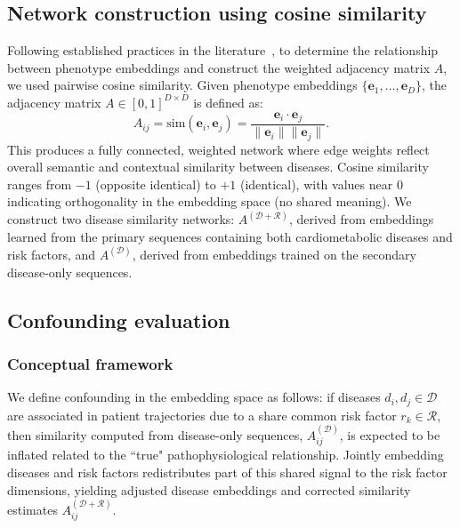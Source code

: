 \subsection{Network construction using cosine similarity}\label{subsection:network_con}
Following established practices in the literature~\citet{gundougan2020research}, to determine the relationship between phenotype embeddings and construct the weighted adjacency matrix $A$, we used pairwise cosine similarity. Given phenotype embeddings $\{\mathbf{e}_1, \ldots, \mathbf{e}_D\}$, the adjacency matrix $A \in [0,1]^{D \times D}$ is defined as:
\begin{equation}\label{eq:cosine_similarity}
A_{ij} = \text{sim}(\mathbf{e}_i, \mathbf{e}_j) = \frac{\mathbf{e}_i \cdot \mathbf{e}_j}{\|\mathbf{e}_i\| \|\mathbf{e}_j\|}.
\end{equation}
This produces a fully connected, weighted network where edge weights reflect overall semantic and contextual similarity between diseases. Cosine similarity ranges from $-1$ (opposite identical) to $+1$ (identical), with values near 0 indicating orthogonality in the embedding space (no shared meaning). We construct two disease similarity networks: $A^{(\mathcal{D}+\mathcal{R})}$, derived from embeddings learned from the primary sequences containing both cardiometabolic diseases and risk factors, and $A^{(\mathcal{D})}$, derived from embeddings trained on the secondary disease-only sequences.

\subsection{Confounding evaluation}\label{subsection:risk_factor}
\subsubsection{Conceptual framework}
We define confounding in the embedding space as follows: if diseases $d_i, d_j \in \mathcal{D}$ are associated in patient trajectories due to a share common risk factor $r_k \in \mathcal{R}$, then similarity computed from disease-only sequences, $A_{ij}^{(\mathcal{D})}$, is expected to be inflated related to the ``true" pathophysiological relationship. Jointly embedding diseases and risk factors redistributes part of this shared signal to the risk factor dimensions, yielding adjusted disease embeddings and corrected similarity estimates $A_{ij}^{(\mathcal{D}+\mathcal{R})}$.

